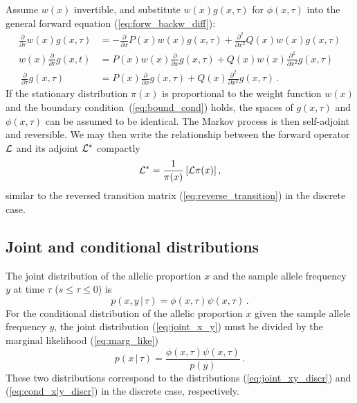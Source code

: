 \documentclass[preprint]{elsarticle}
\newcommand\given{{\,|\,}}
\begin{document}
Assume $w(x)$ invertible, and substitute $w(x)g(x,\tau)$ for $\phi(x,\tau)$ into the general forward equation (\ref{eq:forw_backw_diff}): 
\begin{equation}
\begin{split}
\frac{\partial}{\partial \tau} w(x)g(x,\tau)&=-\frac{\partial}{\partial x}P(x)w(x)g(x,\tau)+\frac{\partial^2}{\partial x^2}Q(x)w(x) g(x,\tau)\\
w(x)\frac{\partial}{\partial \tau}g(x,t)&=P(x)w(x)\frac{\partial}{\partial x}g(x,\tau) +Q(x)w(x)\frac{\partial^2}{\partial x^2}g(x,\tau)\\\
\frac{\partial}{\partial \tau}g(x,\tau)&=P(x)\frac{\partial}{\partial x}g(x,\tau)+Q(x)\frac{\partial^2}{\partial x^2}g(x,\tau)\,.
\end{split}
\end{equation}
If the stationary distribution $\pi(x)$ is proportional to the weight function $w(x)$ and the boundary condition~(\ref{eq:bound_cond}) holds, the spaces of $g(x,\tau)$ and $\phi(x,\tau)$ can be assumed to be identical. The Markov process is then self-adjoint and reversible. We may then write the relationship between the forward operator ${\cal L}$ and its adjoint ${\cal L}^{*}$ compactly
\begin{equation}\label{compact}
{\cal L}^{*}=\frac1{\pi(x)}\left[{\cal L}\pi(x)\right],
\end{equation}
similar to the reversed transition matrix (\ref{eq:reverse_transition}) in the discrete case.


\subsection{Joint and conditional distributions}

The joint distribution of the allelic proportion $x$ and the sample allele frequency $y$ at time $\tau$ ($s \le \tau \le 0$) is
\begin{equation}\label{eq:joint_x_y}
p(x,y \given \tau)= \phi(x, \tau)\psi(x,\tau)\,.
\end{equation}
For the conditional distribution of the allelic proportion $x$ given the sample allele frequency $y$, the joint distribution (\ref{eq:joint_x_y}) must be divided by the marginal likelihood (\ref{eq:marg_like})
\begin{equation}\label{eq:cond_x|y}
p(x\given \tau)= \frac{\phi(x, \tau)\psi(x,\tau)}{p(y)}\,.
\end{equation}
These two distributions correspond to the distributions (\ref{eq:joint_xy_discr}) and (\ref{eq:cond_x|y_discr}) in the discrete case, respectively. 
\end{document}
